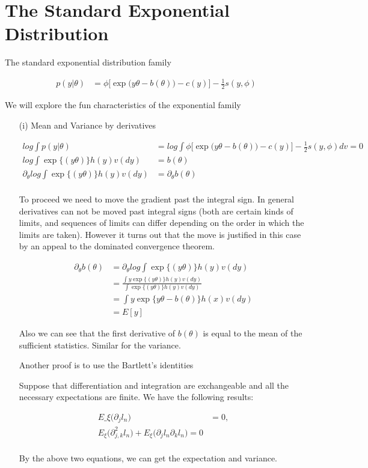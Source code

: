 \section{The Standard Exponential Distribution}

The standard exponential distribution family 

\begin{align*}
p(y| \theta) &= \phi \Big[ \exp \Big( y \theta - b(\theta) \Big) - c(y) \Big] - \frac{1}{2} s(y, \phi)
\end{align*}

We will explore the fun characteristics of the exponential family

\begin{itemize}
\item[(i)] Mean and Variance by derivatives

\begin{align*}
log  \int p(y| \theta) &=log  \int \phi \Big[ \exp \Big( y \theta - b(\theta) \Big) - c(y) \Big] - \frac{1}{2} s(y, \phi) dv = 0 \\
 log \int \exp \{( y \theta ) \} h(y) v(dy) &= b(\theta) \\
 \partial_{\theta} log \int \exp \{( y \theta ) \} h(y) v(dy) &= \partial_{\theta}  b(\theta) \\
\end{align*}

To proceed we need to move the gradient past the integral sign. In general derivatives can not be moved past integral signs (both are certain kinds of limits, and sequences of limits can differ depending on the order in which the limits are taken). However it turns out that the move is justified in this case by an appeal to the dominated convergence theorem. 

\begin{align*}
\partial_{\theta}  b(\theta) &= \partial_{\theta}  log \int \exp \{( y \theta ) \} h(y) v(dy)\\
 &=  \frac{\int y \exp \{( y \theta ) \} h(y) v(dy) }{\int \exp \{( y \theta ) \} h(y) v(dy)} \\
 &= \int y \exp \{ y \theta - b(\theta) \} h(x) v(dy) \\
 &= E[y] 
\end{align*}

Also we can see that the first derivative of $b(\theta)$ is equal to the mean of the sufficient statistics. Similar for the variance.

Another proof is to use the Bartlett's identities

Suppose that differentiation and integration are exchangeable and all the necessary expectations are finite. We have the following results:

\begin{align*}
E\_{\xi} \Big( \partial_j l_n \Big) &= 0,\\
E_{\xi} \Big( \partial^2_{j,k} l_n \Big) + E_{\xi} \Big( \partial_j l_n \partial_k l_n \Big) = 0 \\
\end{align*}

By the above two equations, we can get the expectation and variance. 


\end{itemize}


